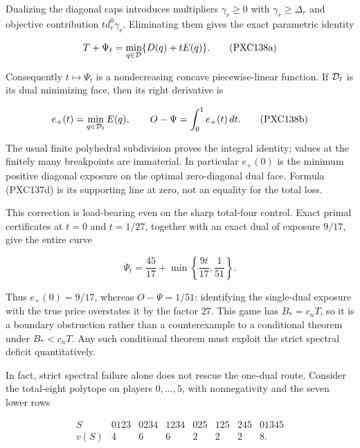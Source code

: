 \documentclass[11pt]{article}
\begin{document}
Dualizing the diagonal caps introduces multipliers
\(\gamma_r\ge0\) with \(\gamma_r\ge\Delta_r\) and objective contribution
\(t d_r^0\gamma_r\).  Eliminating them gives the exact parametric identity

\begin{equation}
 T+\Psi_t=\min_{q\in{\cal D}}\{D(q)+tE(q)\}.             \tag{PXC138a}
\end{equation}

Consequently \(t\mapsto\Psi_t\) is a nondecreasing concave piecewise-linear
function.  If \({\cal D}_t\) is its dual minimizing face, then its right
derivative is

\begin{equation}
 e_+(t)=\min_{q\in{\cal D}_t}E(q),\qquad
 O-\Psi=\int_0^1e_+(t)\,dt.                              \tag{PXC138b}
\end{equation}

The usual finite polyhedral subdivision proves the integral identity; values
at the finitely many breakpoints are immaterial.  In particular
\(e_+(0)\) is the minimum positive diagonal exposure on the optimal
zero-diagonal dual face.  Formula (PXC137d) is its supporting line at zero,
not an equality for the total loss.

This correction is load-bearing even on the sharp total-four control.  Exact
primal certificates at \(t=0\) and \(t=1/27\), together with an exact dual
of exposure \(9/17\), give the entire curve

\begin{equation}
 \Psi_t=\frac{45}{17}+
       \min\left\{\frac{9t}{17},\frac1{51}\right\}.      \tag{PXC138c}
\end{equation}

Thus \(e_+(0)=9/17\), whereas \(O-\Psi=1/51\): identifying the single-dual
exposure with the true price overstates it by the factor \(27\).  This game
has \(B_*=c_nT\), so it is a boundary obstruction rather than a
counterexample to a conditional theorem under \(B_*<c_nT\).  Any such
conditional theorem must exploit the strict spectral deficit quantitatively.

In fact, strict spectral failure alone does not rescue the one-dual route.
Consider the total-eight polytope on players \(0,\ldots,5\), with
nonnegativity and the seven lower rows

\begin{equation}
\begin{array}{c|rrrrrrr}
S&0123&0234&1234&025&125&245&01345\\ \hline
v(S)&4&6&6&2&2&2&8 .
\end{array}                                               \tag{PXC139a}
\end{equation}
\end{document}
